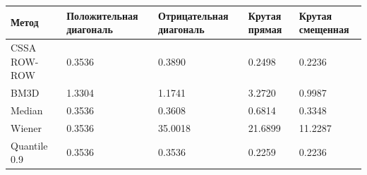 \begin{tabular}{|l|l|l|l|l|}
\hline
Метод & Положительная диагональ & Отрицательная диагональ & Крутая прямая & Крутая смещенная \\
\hline
CSSA ROW-ROW & 0.3536 & 0.3890 & 0.2498 & 0.2236 \\
\hline
BM3D & 1.3304 & 1.1741 & 3.2720 & 0.9987 \\
\hline
Median & 0.3536 & 0.3608 & 0.6814 & 0.3348 \\
\hline
Wiener & 0.3536 & 35.0018 & 21.6899 & 11.2287 \\
\hline
Quantile 0.9 & 0.3536 & 0.3536 & 0.2259 & 0.2236 \\
\hline
\end{tabular}

